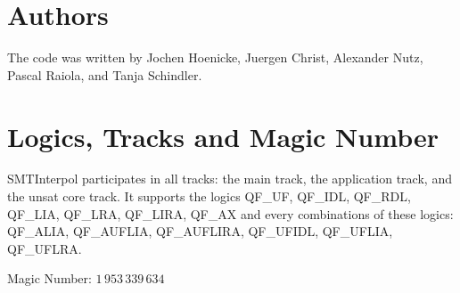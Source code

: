 \documentclass{article}
\newcommand\SI{SMTInterpol\xspace}
\begin{document}
\section*{Authors}
The code was written by Jochen Hoenicke, Juergen Christ, Alexander Nutz, 
Pascal Raiola, and Tanja Schindler.

\section*{Logics, Tracks and Magic Number}

\SI participates in all tracks: the main track, the application track,
and the unsat core track.  It supports the logics QF\_UF, QF\_IDL,
QF\_RDL, QF\_LIA, QF\_LRA, QF\_LIRA, QF\_AX and every combinations of
these logics: QF\_ALIA, QF\_AUFLIA, QF\_AUFLIRA, QF\_UFIDL, QF\_UFLIA,
QF\_UFLRA.

Magic Number: $1\,953\,339\,634$



\end{document}
